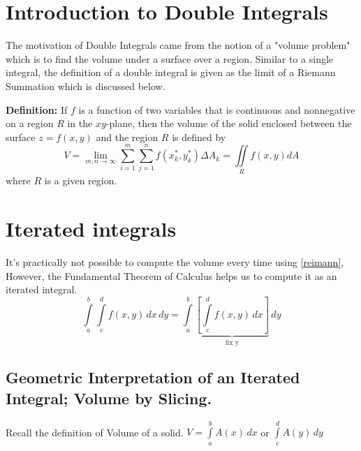 \documentclass{article} %
\title{\color{brownie}{My $\LaTeX$ Playground}}
\author{Rohan Thomas}
\begin{document}
\maketitle
\section{Introduction to Double Integrals}

The motivation of Double Integrals came from the notion of a "volume problem" which is to find the volume under a surface over a region. Similar to a single integral, the definition of a double integral is given as the limit of a Riemann Summation which is discussed below.  
\newline

\begin{framed}
\textbf{Definition:} If $f$ is a function of two variables that is
continuous and nonnegative on a region $R$ in the $xy$-plane, then the volume of the solid enclosed between the surface $z=f(x,y)$ and the region $R$ is defined by
\begin{equation}\label{reimann}
    V=\lim_{m,n\to\infty} \sum_{i=1}^m \sum_{j=1}^n f(x_k^*,y_k^*)\Delta A_k =\iint \limits_R f(x,y) dA 
\end{equation}
where $R$ is a given region.
\end{framed}

\section{Iterated integrals}
It's practically not possible to compute the volume every time using \eqref{reimann}, However, the Fundamental Theorem of Calculus helps us to compute it as an iterated integral.
\begin{equation*}
\int\limits_{a}^{b} \int \limits_{c}^{d} f(x,y) \,dx\,dy =\int\limits_{a}^{b} \underbrace{\left[\int \limits_{c}^{d} f(x,y) \,dx\right]}_{\text{fix y}}\,dy 
\end{equation*}

\subsection{Geometric Interpretation of an Iterated Integral; Volume by Slicing.}
Recall the definition of Volume of a solid. $V= \int \limits_a^b A(x) \,dx$ or $\int \limits_{c}^{d} A(y) \,dy$
\end{document}
